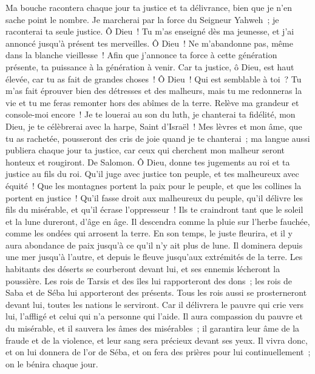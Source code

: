 \begin{multicols}{2}
Ma bouche racontera chaque jour ta justice et ta délivrance, bien que je n'en sache point le nombre.
Je marcherai par la force du Seigneur Yahweh~; je raconterai ta seule justice.
Ô Dieu~! Tu m'as enseigné dès ma jeunesse, et j'ai annoncé jusqu'à présent tes merveilles.
Ô Dieu~! Ne m'abandonne pas, même dans la blanche vieillesse~! Afin que j'annonce ta force à cette génération présente, ta puissance à la génération à venir.
Car ta justice, ô Dieu, est haut élevée, car tu as fait de grandes choses~! Ô Dieu~! Qui est semblable à toi~?
Tu m'as fait éprouver bien des détresses et des malheurs, mais tu me redonneras la vie et tu me feras remonter hors des abîmes de la terre.
Relève ma grandeur et console-moi encore~!
Je te louerai au son du luth, je chanterai ta fidélité, mon Dieu, je te célèbrerai avec la harpe, Saint d'Israël~!
Mes lèvres et mon âme, que tu as rachetée, pousseront des cris de joie quand je te chanterai~;
ma langue aussi publiera chaque jour ta justice, car ceux qui cherchent mon malheur seront honteux et rougiront.
\VerseOne{}De Salomon. Ô Dieu, donne tes jugements au roi et ta justice au fils du roi.
Qu'il juge avec justice ton peuple, et tes malheureux avec équité~!
Que les montagnes portent la paix pour le peuple, et que les collines la portent en justice~!
Qu'il fasse droit aux malheureux du peuple, qu'il délivre les fils du misérable, et qu'il écrase l'oppresseur~!
Ils te craindront tant que le soleil et la lune dureront, d'âge en âge.
Il descendra comme la pluie sur l'herbe fauchée, comme les ondées qui arrosent la terre.
En son temps, le juste fleurira, et il y aura abondance de paix jusqu'à ce qu'il n'y ait plus de lune.
Il dominera depuis une mer jusqu'à l'autre, et depuis le fleuve jusqu'aux extrémités de la terre.
Les habitants des déserts se courberont devant lui, et ses ennemis lécheront la poussière.
Les rois de Tarsis et des îles lui rapporteront des dons~; les rois de Saba et de Séba lui apporteront des présents.
Tous les rois aussi se prosterneront devant lui, toutes les nations le serviront.
Car il délivrera le pauvre qui crie vers lui, l'affligé et celui qui n'a personne qui l'aide.
Il aura compassion du pauvre et du misérable, et il sauvera les âmes des misérables~;
il garantira leur âme de la fraude et de la violence, et leur sang sera précieux devant ses yeux.
Il vivra donc, et on lui donnera de l'or de Séba, et on fera des prières pour lui continuellement~; on le bénira chaque jour.

\end{multicols}
